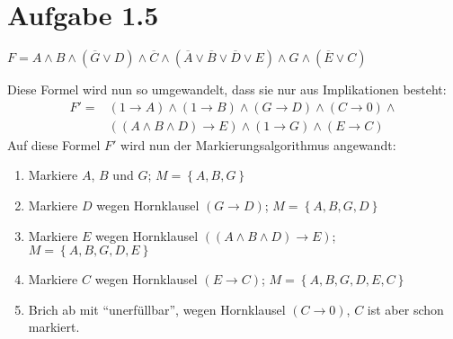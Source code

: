 \documentclass[a4paper,12pt]{article}
\begin{document}
	\section*{Aufgabe 1.5}
	\begin{center}
		$F = A \wedge B \wedge \left( \overline{G} \vee D\right) \wedge \overline{C} \wedge \left( \overline{A} \vee \overline{B} \vee \overline{D} \vee E\right) \wedge G \wedge \left( \overline{E} \vee C\right)$\\
	\end{center}
	Diese Formel wird nun so umgewandelt, dass sie nur aus Implikationen besteht:
	\begin{align*}
		F' = &\left( 1 \rightarrow A\right) \wedge \left( 1 \rightarrow B\right) \wedge \left( G \rightarrow D\right) \wedge \left( C \rightarrow 0\right) \wedge \\&\left( \left(A \wedge B \wedge D\right) \rightarrow E\right) \wedge \left( 1 \rightarrow G\right) \wedge \left( E \rightarrow C\right)
	\end{align*}
	Auf diese Formel $F'$ wird nun der Markierungsalgorithmus angewandt:
	\begin{enumerate}
		\item Markiere $A$, $B$ und $G$; $M = \left\lbrace A, B, G\right\rbrace$
		\item Markiere $D$ wegen Hornklausel $\left( G \rightarrow D \right)$; $M = \left\lbrace A, B, G, D\right\rbrace$
		\item Markiere $E$ wegen Hornklausel $\left( \left(A \wedge B \wedge D\right) \rightarrow E\right)$; $M = \left\lbrace A, B, G, D, E\right\rbrace$
		\item Markiere $C$ wegen Hornklausel $\left( E \rightarrow C\right)$; $M = \left\lbrace A, B, G, D, E, C\right\rbrace$
		\item Brich ab mit "`unerfüllbar"', wegen Hornklausel $\left( C \rightarrow 0\right)$, $C$ ist aber schon markiert.
	\end{enumerate}
\end{document}
